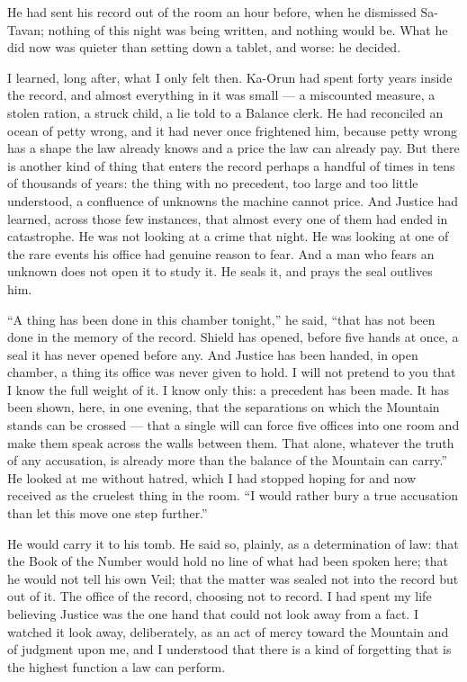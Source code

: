 He had sent his record out of the room an hour before, when he dismissed Sa-Tavan; nothing of this night was being written, and nothing would be. What he did now was quieter than setting down a tablet, and worse: he decided.\par
 
I learned, long after, what I only felt then. Ka-Orun had spent forty years inside the record, and almost everything in it was small — a miscounted measure, a stolen ration, a struck child, a lie told to a Balance clerk. He had reconciled an ocean of petty wrong, and it had never once frightened him, because petty wrong has a shape the law already knows and a price the law can already pay. But there is another kind of thing that enters the record perhaps a handful of times in tens of thousands of years: the thing with no precedent, too large and too little understood, a confluence of unknowns the machine cannot price. And Justice had learned, across those few instances, that almost every one of them had ended in catastrophe. He was not looking at a crime that night. He was looking at one of the rare events his office had genuine reason to fear. And a man who fears an unknown does not open it to study it. He seals it, and prays the seal outlives him.\par
 
``A thing has been done in this chamber tonight,'' he said, ``that has not been done in the memory of the record. Shield has opened, before five hands at once, a seal it has never opened before any. And Justice has been handed, in open chamber, a thing its office was never given to hold. I will not pretend to you that I know the full weight of it. I know only this: a precedent has been made. It has been shown, here, in one evening, that the separations on which the Mountain stands can be crossed — that a single will can force five offices into one room and make them speak across the walls between them. That alone, whatever the truth of any accusation, is already more than the balance of the Mountain can carry.'' He looked at me without hatred, which I had stopped hoping for and now received as the cruelest thing in the room. ``I would rather bury a true accusation than let this move one step further.''\par
 
He would carry it to his tomb. He said so, plainly, as a determination of law: that the Book of the Number would hold no line of what had been spoken here; that he would not tell his own Veil; that the matter was sealed not into the record but out of it. The office of the record, choosing not to record. I had spent my life believing Justice was the one hand that could not look away from a fact. I watched it look away, deliberately, as an act of mercy toward the Mountain and of judgment upon me, and I understood that there is a kind of forgetting that is the highest function a law can perform.\par
 
